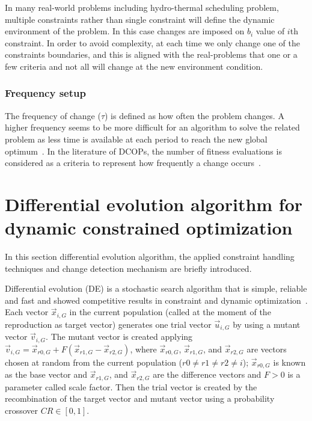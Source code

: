 \documentclass[conference]{IEEEtran}
\begin{document}
In many real-world problems including hydro-thermal scheduling problem, multiple constraints rather than single constraint will define the dynamic environment of the problem. In this case changes are imposed on $b_i$ value of $i$th constraint. In order to avoid complexity, at each time we only change one of the constraints boundaries, and this is aligned with the real-problems that one or a few criteria and not all will change at the new environment condition.   
\subsubsection{Frequency setup}
\label{subsec:FrequencySetup}

The frequency of change ($\tau$) is defined as how often the problem changes. A higher frequency seems to be more difficult for an algorithm to solve the related problem as less time is available at each period to reach the new global optimum~\cite{rohlfshagen2009dynamic}.
In the literature of DCOPs, the number of fitness evaluations is considered as a criteria to represent how frequently a change occurs~\cite{nguyen2012continuous}. 

\section{Differential evolution algorithm for dynamic constrained optimization}
In this section differential evolution algorithm, the applied constraint handling techniques and change detection mechanism are briefly introduced.

Differential evolution (DE) is a stochastic search algorithm that is simple, reliable and fast and showed competitive results in constraint and dynamic optimization~\cite{ameca2018comparison}. Each vector $\vec{x}_{i, G}$ in the current population (called at the moment of the reproduction as target vector) generates one trial vector $\vec{u}_{i, G}$ by using a mutant vector $\vec{v}_{i,G}$. The mutant vector is created applying $\vec{v}_{i,G}= \vec{x}_{r0,G} + F (\vec{x}_{r1,G} - \vec{x}_{r2,G})$,
where $\vec{x}_{r0,G}$, $\vec{x}_{r1,G}$, and $\vec{x}_{r2,G}$ are vectors chosen at random from the current population ($r0 \neq r1 \neq r2 \neq i$); $\vec{x}_{r0,G}$ is known as the base vector and $\vec{x}_{r1,G}$, and $\vec{x}_{r2,G}$ are the difference vectors and $F>0$ is a parameter called scale factor. Then the trial vector is created by the recombination of the target vector and mutant vector using a probability crossover $CR \in [0,1]$. 
\end{document}
